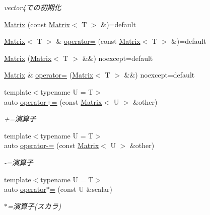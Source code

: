 \begin{DoxyCompactItemize}
\begin{DoxyCompactList}\small\item\em vector4での初期化 \end{DoxyCompactList}\item 
\mbox{\hyperlink{classsaki_1_1_matrix_a08d28bd14af9be6650325574a20101d7}{Matrix}} (const \mbox{\hyperlink{classsaki_1_1_matrix}{Matrix}}$<$ T $>$ \&)=default
\item 
\mbox{\hyperlink{classsaki_1_1_matrix}{Matrix}}$<$ T $>$ \& \mbox{\hyperlink{classsaki_1_1_matrix_af83ebe0a4f4652fbf30dd64307021603}{operator=}} (const \mbox{\hyperlink{classsaki_1_1_matrix}{Matrix}}$<$ T $>$ \&)=default
\item 
\mbox{\hyperlink{classsaki_1_1_matrix_aced6f31e05917c2c41305dd0be082f8b}{Matrix}} (\mbox{\hyperlink{classsaki_1_1_matrix}{Matrix}}$<$ T $>$ \&\&) noexcept=default
\item 
\mbox{\hyperlink{classsaki_1_1_matrix}{Matrix}} \& \mbox{\hyperlink{classsaki_1_1_matrix_a96b3519d691108a606d4ece3a9bac134}{operator=}} (\mbox{\hyperlink{classsaki_1_1_matrix}{Matrix}}$<$ T $>$ \&\&) noexcept=default
\item 
{\footnotesize template$<$typename U  = T$>$ }\\auto \mbox{\hyperlink{classsaki_1_1_matrix_a06e54f0ce6ff0cd591725a753d9a4c60}{operator+=}} (const \mbox{\hyperlink{classsaki_1_1_matrix}{Matrix}}$<$ U $>$ \&other)
\begin{DoxyCompactList}\small\item\em +=演算子 \end{DoxyCompactList}\item 
{\footnotesize template$<$typename U  = T$>$ }\\auto \mbox{\hyperlink{classsaki_1_1_matrix_a782a94fb837a9973fed259c55e6817f1}{operator-\/=}} (const \mbox{\hyperlink{classsaki_1_1_matrix}{Matrix}}$<$ U $>$ \&other)
\begin{DoxyCompactList}\small\item\em -\/=演算子 \end{DoxyCompactList}\item 
{\footnotesize template$<$typename U  = T$>$ }\\auto \mbox{\hyperlink{classsaki_1_1_matrix_aae1ffee9f67e7c9893a2329c75bd8a51}{operator$\ast$=}} (const U \&scalar)
\begin{DoxyCompactList}\small\item\em $\ast$=演算子(スカラ) \end{DoxyCompactList}\item 

\end{DoxyCompactItemize}
